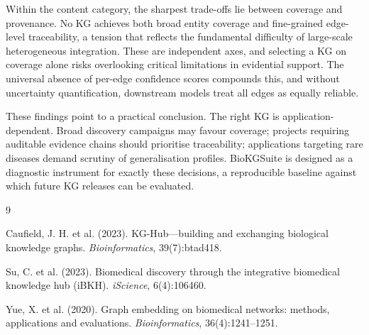 \documentclass[10pt,a4paper]{article}
\begin{document}
Within the content category, the sharpest trade-offs lie between coverage and provenance. No KG achieves both broad entity coverage and fine-grained edge-level traceability, a tension that reflects the fundamental difficulty of large-scale heterogeneous integration. These are independent axes, and selecting a KG on coverage alone risks overlooking critical limitations in evidential support. The universal absence of per-edge confidence scores compounds this, and without uncertainty quantification, downstream models treat all edges as equally reliable.

These findings point to a practical conclusion. The right KG is application-dependent. Broad discovery campaigns may favour coverage; projects requiring auditable evidence chains should prioritise traceability; applications targeting rare diseases demand scrutiny of generalisation profiles. BioKGSuite is designed as a diagnostic instrument for exactly these decisions, a reproducible baseline against which future KG releases can be evaluated.


\begin{thebibliography}{9}

Caufield, J. H. et al. (2023).
KG-Hub---building and exchanging biological knowledge graphs.
\textit{Bioinformatics}, 39(7):btad418.

Su, C. et al. (2023).
Biomedical discovery through the integrative biomedical knowledge hub (iBKH).
\textit{iScience}, 6(4):106460.

Yue, X. et al. (2020).
Graph embedding on biomedical networks: methods, applications and evaluations.
\textit{Bioinformatics}, 36(4):1241--1251.

\end{thebibliography}
\end{document}
